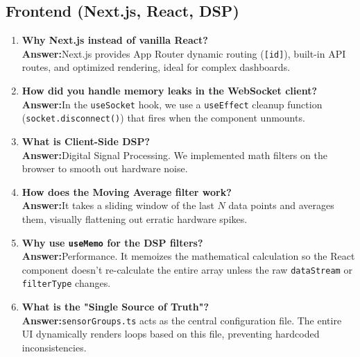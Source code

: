 \documentclass[12pt,a4paper]{article}
\newcommand{\keyword}[1]{\textcolor{keywordcolor}{\textbf{#1}}}
\newcommand{\Q}[1]{\textcolor{questioncolor}{\textbf{#1}}}
\newcommand{\A}{\textcolor{answercolor}{\textbf{Answer:}}}
\newcommand{\codeinline}[1]{\texttt{\small #1}}
\begin{document}
\subsection*{Frontend (Next.js, React, \keyword{DSP})}
\begin{enumerate}[resume]
    \item \Q{Why Next.js instead of vanilla React?} \\ \A Next.js provides App Router dynamic routing (\texttt{[id]}), built-in API routes, and optimized rendering, ideal for complex dashboards.
    \item \Q{How did you handle memory leaks in the \keyword{WebSocket} client?} \\ \A In the \texttt{useSocket} hook, we use a \texttt{useEffect} cleanup function (\texttt{socket.disconnect()}) that fires when the component unmounts.
    \item \Q{What is Client-Side \keyword{DSP}?} \\ \A Digital Signal Processing. We implemented math filters on the browser to smooth out hardware noise.
    \item \Q{How does the Moving Average filter work?} \\ \A It takes a sliding window of the last $N$ data points and averages them, visually flattening out erratic hardware spikes.
    \item \Q{Why use \codeinline{useMemo} for the \keyword{DSP} filters?} \\ \A Performance. It memoizes the mathematical calculation so the React component doesn't re-calculate the entire array unless the raw \codeinline{dataStream} or \codeinline{filterType} changes.
    \item \Q{What is the "\keyword{Single Source of Truth}"?} \\ \A \texttt{sensorGroups.ts} acts as the central configuration file. The entire UI dynamically renders loops based on this file, preventing hardcoded inconsistencies.
\end{enumerate}
\end{document}
